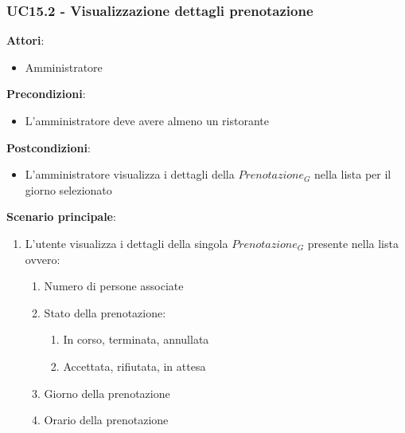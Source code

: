 \subsubsection{UC15.2 - Visualizzazione dettagli prenotazione}\label{usecase:15_2}
\textbf{Attori}:
\begin{itemize}
    \item Amministratore
\end{itemize}
\textbf{Precondizioni}:
\begin{itemize}
    \item L'amministratore deve avere almeno un ristorante
\end{itemize}
\textbf{Postcondizioni}:
\begin{itemize}
    \item L'amministratore visualizza i dettagli della $\textit{Prenotazione}_G$ nella lista per il giorno selezionato
\end{itemize}
\textbf{Scenario principale}:
\begin{enumerate}
    \item L'utente visualizza i dettagli della singola $\textit{Prenotazione}_G$ presente nella lista ovvero:
    \begin{enumerate}
        \item Numero di persone associate
        \item Stato della prenotazione:
         \begin{enumerate}
           \item In corso, terminata, annullata
            \item Accettata, rifiutata, in attesa
       \end{enumerate}
    \item Giorno della prenotazione
    \item Orario della prenotazione
    \end{enumerate}
\end{enumerate}
\newpage